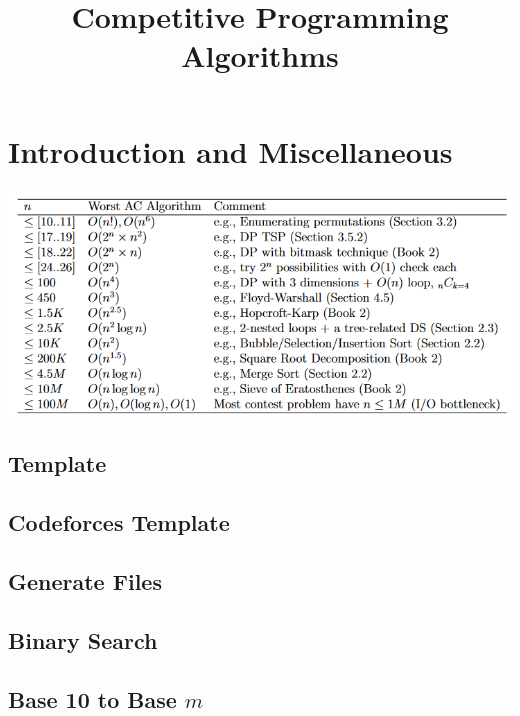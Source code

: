 \documentclass[11pt, letterpaper]{article}
\title{\vspace{-1cm}\bf Competitive Programming Algorithms}
\author{}
\date{}
\begin{document}
\maketitle
\tableofcontents
\pagebreak

\section{Introduction and Miscellaneous}

\begin{center}
    \includegraphics[scale=0.65]{assets/table.png}
\end{center}

\subsection{Template}


\subsection{Codeforces Template}


\subsection{Generate Files}


\subsection{Binary Search}


\subsection{Base 10 to Base $m$}

\end{document}
